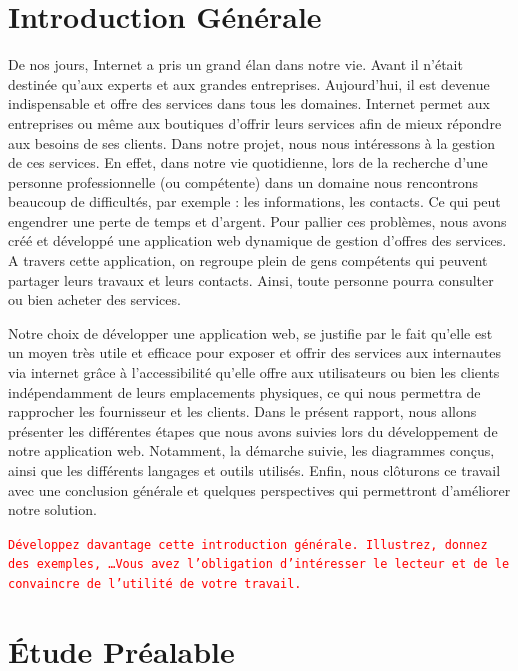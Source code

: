 \documentclass[french]{report}
\newcommand\rmq[1]{\textcolor{red}{\tt #1}}
\begin{document}

\tableofcontents
\listoffigures
\listoftables


\chapter*{Introduction Générale}

De nos jours, Internet a pris un grand élan dans notre vie. Avant il n'était
destinée qu'aux experts et aux grandes entreprises. Aujourd'hui, il est
devenue indispensable et offre des services dans tous les domaines. Internet
permet aux entreprises ou même aux boutiques d'offrir leurs services afin de
mieux répondre aux besoins de ses clients. Dans notre projet, nous nous
intéressons à la gestion de ces services.  En effet, dans notre vie quotidienne,
lors de la recherche d'une personne professionnelle (ou compétente) dans un
domaine   nous rencontrons beaucoup de difficultés, par exemple : les
informations, les contacts. Ce qui  peut engendrer une perte de temps et
d'argent. Pour pallier ces problèmes, nous avons créé  et développé une
application web dynamique de gestion d'offres des services. A travers cette
application, on regroupe plein de gens compétents qui peuvent partager leurs
travaux et leurs contacts. Ainsi, toute personne pourra consulter ou bien
acheter des services. 

Notre choix de développer une application web, se justifie par le fait qu'elle
est un moyen très utile et efficace pour exposer et offrir des services aux
internautes via internet grâce à l'accessibilité qu'elle offre aux utilisateurs
ou bien les clients indépendamment de leurs emplacements physiques, ce qui nous
permettra de rapprocher les fournisseur et les clients.  Dans le présent rapport,
nous allons présenter les différentes étapes que nous avons suivies lors du
développement de notre application web. Notamment, la démarche suivie, les
diagrammes conçus, ainsi que les différents langages et outils utilisés. Enfin, 
nous clôturons ce travail avec une conclusion générale et quelques
perspectives qui permettront d'améliorer notre solution.

\rmq{Développez davantage cette introduction générale. Illustrez, donnez des
exemples, \ldots Vous avez l'obligation d'intéresser le lecteur et de le
convaincre de l'utilité de votre travail.}



\chapter{Étude Préalable}
\end{document}
